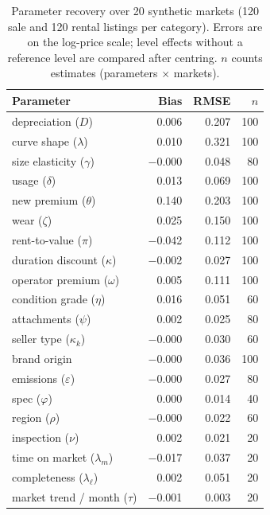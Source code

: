 \begin{table}[t]
\centering\small
\caption{Parameter recovery over 20 synthetic markets (120 sale and 120 rental listings per category). Errors are on the log-price scale; level effects without a reference level are compared after centring. $n$ counts estimates (parameters $\times$ markets).}
\label{tab:recovery}
\begin{tabular}{lrrr}
\toprule
Parameter & Bias & RMSE & $n$ \\
\midrule
depreciation ($D$) & 0.006 & 0.207 & 100 \\
curve shape ($\lambda$) & 0.010 & 0.321 & 100 \\
size elasticity ($\gamma$) & $-$0.000 & 0.048 & 80 \\
usage ($\delta$) & 0.013 & 0.069 & 100 \\
new premium ($\theta$) & 0.140 & 0.203 & 100 \\
wear ($\zeta$) & 0.025 & 0.150 & 100 \\
rent-to-value ($\pi$) & $-$0.042 & 0.112 & 100 \\
duration discount ($\kappa$) & $-$0.002 & 0.027 & 100 \\
operator premium ($\omega$) & 0.005 & 0.111 & 100 \\
condition grade ($\eta$) & 0.016 & 0.051 & 60 \\
attachments ($\psi$) & 0.002 & 0.025 & 80 \\
seller type ($\kappa_k$) & $-$0.000 & 0.030 & 60 \\
brand origin & $-$0.000 & 0.036 & 100 \\
emissions ($\varepsilon$) & $-$0.000 & 0.027 & 80 \\
spec ($\varphi$) & 0.000 & 0.014 & 40 \\
region ($\rho$) & $-$0.000 & 0.022 & 60 \\
inspection ($\nu$) & 0.002 & 0.021 & 20 \\
time on market ($\lambda_m$) & $-$0.017 & 0.037 & 20 \\
completeness ($\lambda_\ell$) & 0.002 & 0.051 & 20 \\
market trend / month ($\tau$) & $-$0.001 & 0.003 & 20 \\
\bottomrule
\end{tabular}
\end{table}
